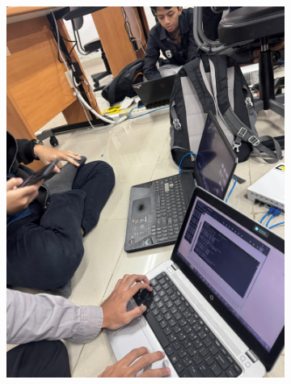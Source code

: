 \begin{figure}[H]
\begin{subfigure}[b]{0.4\linewidth}
		\includegraphics[width=\linewidth]{P2/img/dokum (6).jpg}
	\end{subfigure}
	\begin{subfigure}[b]{0.4\linewidth}
		\centering

\end{subfigure}
\end{figure}
